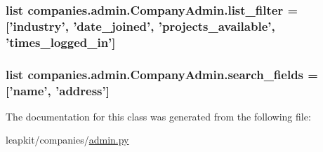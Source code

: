 \hypertarget{classcompanies_1_1admin_1_1_company_admin_a285da13dddd652fd19fcfd2612b12d5a}{
\subsubsection[{list\-\_\-filter}]{\setlength{\rightskip}{0pt plus 5cm}list companies.\-admin.\-Company\-Admin.\-list\-\_\-filter = \mbox{[}'industry', 'date\-\_\-joined', 'projects\-\_\-available', 'times\-\_\-logged\-\_\-in'\mbox{]}\hspace{0.3cm}{\ttfamily [static]}}}\label{classcompanies_1_1admin_1_1_company_admin_a285da13dddd652fd19fcfd2612b12d5a}
\hypertarget{classcompanies_1_1admin_1_1_company_admin_ae59cc3241149e85ca34e69ac730718bd}{
\subsubsection[{search\-\_\-fields}]{\setlength{\rightskip}{0pt plus 5cm}list companies.\-admin.\-Company\-Admin.\-search\-\_\-fields = \mbox{[}'name', 'address'\mbox{]}\hspace{0.3cm}{\ttfamily [static]}}}\label{classcompanies_1_1admin_1_1_company_admin_ae59cc3241149e85ca34e69ac730718bd}


The documentation for this class was generated from the following file\-:\begin{DoxyCompactItemize}
\item 
leapkit/companies/\hyperlink{companies_2admin_8py}{admin.\-py}\end{DoxyCompactItemize}
